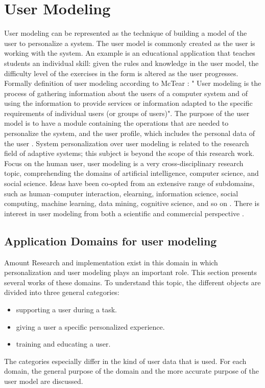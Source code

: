 \section{User Modeling}



User modeling can be represented as the technique of building a model of the
user to personalize a system. The user model is commonly created as the user is
working with the system. An example is an educational application that teaches
students an individual skill: given the rules and knowledge in the user model,
the difficulty level of the exercises in the form is altered as the user
progresses. Formally definition of user modeling according to McTear
\cite{mctear1993user} : " User modeling is the process of gathering information
about the users of a computer system and of using the information to provide
services or information adapted to the specific requirements of individual users
(or groups of users)". The purpose of the user model is to have a module
containing the operations that are needed to personalize the system, and the
user profile, which includes the personal data of the user
\cite{fischer2001user}. System personalization over user modeling is related
to the research field of adaptive systems; this subject is beyond the scope of
this research work. Focus on the human user, user modeling is a very
cross-disciplinary research topic, comprehending the domains of artificial
intelligence, computer science, and social science. Ideas have been co‐opted
from an extensive range of subdomains, such as human–computer interaction,
e\textendash learning, information science, social computing, machine learning, data
mining, cognitive science, and so on \cite{kay2012coming}
\cite{kobsa2001generic}. There is interest in user modeling from both a
scientific and commercial perspective \cite{razmerita2009user}.
\subsection{Application Domains for user modeling}

Amount Research and implementation exist in this domain in which personalization
and user modeling plays an important role. This section presents several works
of these domains. To understand this topic, the different objects are divided
into three general categories:
\begin{itemize}
	\item {supporting a user during a task. }
	\item {giving a user a specific personalized experience. }
	\item {training and educating a user.}
\end{itemize}
The categories especially differ in the kind of user data that is used. For each
domain, the general purpose of the domain and the more accurate purpose of the
user model are discussed.

